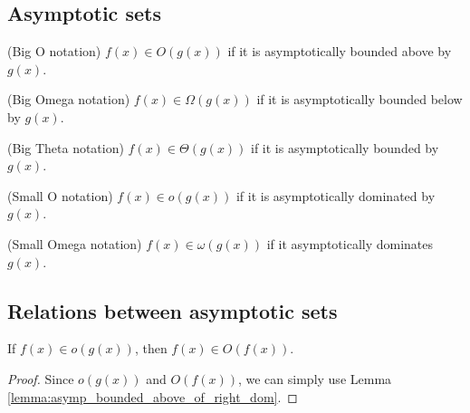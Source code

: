 \subsection{Asymptotic sets}

\begin{definition}(Big O notation)
    \label{def:big_o}
    \leanok
    $f(x) \in O(g(x))$ if it is asymptotically bounded above by $g(x)$.
\end{definition}

\begin{definition}(Big Omega notation)
    \label{def:big_omega}
    \leanok
    $f(x) \in \Omega(g(x))$ if it is asymptotically bounded below by $g(x)$.
\end{definition}

\begin{definition}(Big Theta notation)
    \label{def:big_theta}
    \leanok
    $f(x) \in \Theta(g(x))$ if it is asymptotically bounded by $g(x)$. 
\end{definition}

\begin{definition}(Small O notation)
    \label{def:small_o}
    \leanok
    $f(x) \in o(g(x))$ if it is asymptotically dominated by $g(x)$.
\end{definition}

\begin{definition}(Small Omega notation)
    \label{def:small_omega}
    \leanok
    $f(x) \in \omega(g(x))$ if it asymptotically dominates $g(x)$.
\end{definition}


\subsection{Relations between asymptotic sets} \begin{lemma}
    \label{lemma:big_o_of_small_o}
    \leanok
    If $f(x) \in o(g(x))$, then $f(x) \in O(f(x))$.
\end{lemma}

\begin{proof}
    \leanok
    Since $o(g(x))$ and $O(f(x))$, we can simply use Lemma 
    \ref{lemma:asymp_bounded_above_of_right_dom}.
\end{proof}

